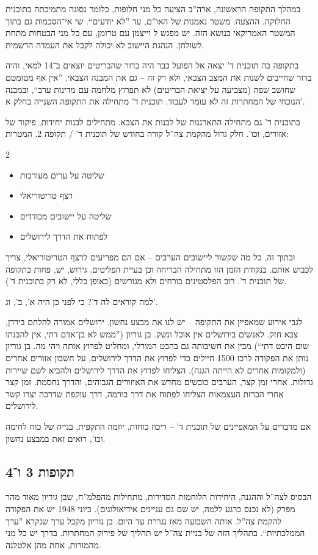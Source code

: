 \documentclass[]{../../../../tex/classes/styledArticle}
\begin{document}
	במהלך התקופה הראשונה, ארה''ב הציעה כל מני חלופות, כלומר נסוגה מתמיכתה בתוכנית החלוקה. ההצעה: משטר נאמנות של האו''ם, עד ''לא יודעים``. שי אי־הסכמות גם בתוך המשטר האמריקאי בנושא הזה. יש מפגש ל וייצמן עם טרומן, עם כל מני הבטחות מתחת לשולחן. הנהגת היישוב לא יכולה לקבל את העמדה הרשמית. 
	
	בתקופה בה תוכנית ד' יצאה אל הפועל כבר היה ברור שהבריטים יוצאים ב־14 למאי, והיה ברור שחייבים לשנות את המצב הצבאי, ולא רק זה – גם את המבנה הצבאי. ''אין אף מטומטם שחושב שפה (מצביעה על יציאת הבריטים) לא תפרוץ מלחמה עם מדינות ערב``, ובמבנה הנוכחי של המחתרות זה לא עומד לעבוד. תוכנית ד' מתחילה את התקופה השנייה בחלק א'. 
	
	בתוכנית ד' גם מתחילה התארגנות של לבנות את הצבא. מתחילים לבנות יחידות, פיקוד של אזורים, וכו'. חלק גדול מהקמת צה''ל קורה בחודש של תוכנית ד' / תקופה 2. המטרות: 
	\begin{multicols}{2}
		\begin{itemize}
			\item שליטה על ערים מעורבות
			\item רצף טריטוריאלי
			\item שליטה על יישובים מבודדים
			\item לפתוח את הדרך לירושלים
		\end{itemize}
	\end{multicols}
	ובתוך זה, כל מה שקשור ליישובים הערבים – אם הם מפריעים לרצף הטריטוריאלי, צריך לכבוש אותם. בנקודת הזמן הזו מתחילה הבריחה וכן בעיית הפליטים. גירוש, יש, פחות בתקופה של תוכנית ד'. רוב הפלסטינים בורחים ולא מגורשים (באופן כללי, לא רק בתוכנית ד'). 
	
	למה קוראים לה ד'? כי לפני כן היה א', ב', וג'. 
	
	לגבי אירוע שמאפיין את התקופה – יש לנו את מבצע נחשון. ירושלים אמורה להלחם בירדן, צבא חזק. לאנשים בירושלים אין אוכל ונשק. בן גוריון (''ממש לא בן־אדם דתי, אין להבנתו שום היבט דתי``) מבין את חשיבותה גם בהבט המורלי, ומחליט לפרוץ אותה ויהי מה. בן גוריון נותן את הפקודה לרכז 1500 חיילים כדי לפרוץ את הדרך לירושלים, על חשבון אזורים אחרים (ולמקומות אחרים לא הייתה הגנה). הצליחו לפרוץ את הדרך לירושלים ולהביא לשם שיירות גדולות. אחרי זמן קצר, הערבים כובשים מחדש את האיזורים הגבוהים, והדרך נחסמת. זמן קצר אחרי הכרזת העצמאות הצליחו לפתוח את דרך בורמה, דרך עוקפת שדרכה יצרו קשר לירושלים. 
	
	אם מדברים על המאפיינים של תוכנית ד' – ריכוז כוחות, יוזמה התקפית, בנייה של כוח לחימה וכו', רואים זאת במבצע נחשון. 
	
	\subsection*{תקופות 3 ו־4}
	הבסיס לצה''ל וההגנה, היחידות הלוחמות הסדירות, מתחילות מהפלמ''ח, שבן גוריון מאוד מהר מפרק (לא נכנס כרגע ללמה, יש שם גם עניינים אידיאולוגים). ביוני 1948 יש את הפקודה להקמת צה''ל. אותה השבועה מאז נגררת עד היום. בן גוריון מקבל ערך שנקרא ''ערך הממלכתיות``. בתהליך הזה של בניית צה''ל יש תהליך של פירוק המחתרות. בדרך יש כל מני מהמורות, אחת מהן אלטלנה.
	
\end{document}
